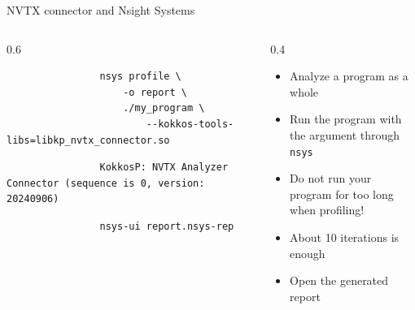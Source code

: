 \documentclass[
    aspectratio=169,
]{beamer}
\begin{document}
\begin{frame}[fragile]{NVTX connector and Nsight Systems}
    \begin{columns}
        \begin{column}{0.6\linewidth}
            \begin{verbatim}
                nsys profile \
                    -o report \
                    ./my_program \
                        --kokkos-tools-libs=libkp_nvtx_connector.so
            \end{verbatim}

            \begin{verbatim}
                KokkosP: NVTX Analyzer Connector (sequence is 0, version: 20240906)
            \end{verbatim}

            \begin{verbatim}
                nsys-ui report.nsys-rep
            \end{verbatim}
        \end{column}
        \begin{column}{0.4\linewidth}
            \begin{itemize}
                \item Analyze a program as a whole
                \item Run the program with the argument through \texttt{nsys}
                \item Do not run your program for too long when profiling!
                \item About 10 iterations is enough
                \item Open the generated report
            \end{itemize}
        \end{column}
    \end{columns}
\end{frame}
\end{document}
